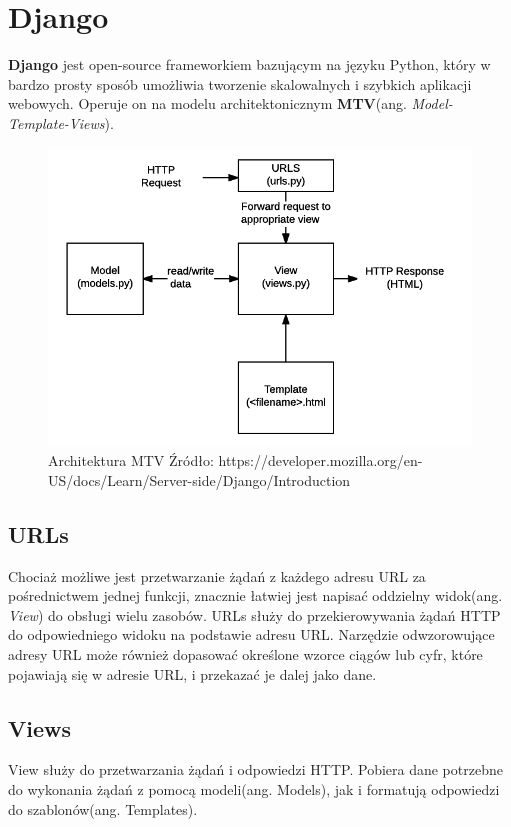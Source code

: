 \documentclass[oneside,polski,logo,indent]{amuthesis}
\begin{document}
\section{Django}
\textbf{Django} jest open-source frameworkiem bazującym na języku Python, który w bardzo prosty sposób umożliwia tworzenie skalowalnych i szybkich aplikacji webowych. Operuje on na modelu architektonicznym \textbf{MTV}(ang. \emph{Model-Template-Views}). 

\begin{figure}[H]
\centering
\includegraphics[width=14cm]{mtv.png}
\caption{Architektura MTV\newline
Źródło: https://developer.mozilla.org/en-US/docs/Learn/Server-side/Django/Introduction}
\label{MTV}
\end{figure}

\begin{center}
\subsection{URLs}
\end{center}
Chociaż możliwe jest przetwarzanie żądań z każdego adresu URL za pośrednictwem jednej funkcji, znacznie łatwiej jest napisać oddzielny widok(ang. \emph{View}) do obsługi wielu zasobów. URLs służy do przekierowywania żądań HTTP do odpowiedniego widoku na podstawie adresu URL. Narzędzie odwzorowujące adresy URL może również dopasować określone wzorce ciągów lub cyfr, które pojawiają się w adresie URL, i przekazać je dalej jako dane.


\begin{center}
\subsection{Views}
\end{center}
View służy do przetwarzania żądań i odpowiedzi HTTP. Pobiera dane potrzebne do wykonania żądań z pomocą modeli(ang. Models), jak i formatują odpowiedzi do szablonów(ang. Templates).
\end{document}
